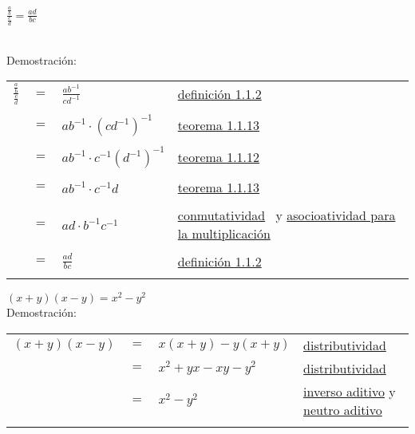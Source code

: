 \begin{teo}
$\displaystyle\frac{\displaystyle\frac{a}{b}}{\displaystyle\frac{c}{d}}=\displaystyle\frac{ad}{bc}$\\\\ \label{teo 1.1.18}

Demostración:
\begin{center}
\begin{tabular}{r c l l}
$\displaystyle\frac{\displaystyle\frac{a}{b}}{\displaystyle\frac{c}{d}}$&$=$&$\displaystyle\frac{ab^{-1}}{cd^{-1}}$&\hyperref[def 1.1.2]{definición 1.1.2}\\\\
&$=$&$ab^{-1}\cdot (cd^{-1})^{-1}$&\hyperref[teo 1.1.13]{teorema 1.1.13}\\\\
&$=$&$ab^{-1}\cdot c^{-1}(d^{-1})^{-1}$&\hyperref[teo 1.1.12]{teorema 1.1.12}\\\\
&$=$&$ab^{-1}\cdot c^{-1}d$&\hyperref[teo 1.1.13]{teorema 1.1.13}\\\\
&$=$&$ad\cdot b^{-1}c^{-1}$&\hyperref[M2]{conmutatividad} \
y \hyperref[M3]{asocioatividad para la multiplicación}\\\\
&$=$&$\displaystyle \frac{ad}{bc}$&\hyperref[def 1.1.2]{definición 1.1.2}\\\\
\end{tabular}
\end{center}
\end{teo}


\begin{teo}
$(x+y)(x-y)=x^2 - y^2$\\ \label{teo 1.1.19}
Demostración:
\begin{center}
\begin{tabular}{r c l l}
$(x+y)(x-y)$&$=$&$x(x+y)-y(x+y)$&\hyperref[D]{distributividad}\\
&$=$&$x^{2}+yx-xy - y^2$&\hyperref[D]{distributividad}\\
&$=$&$x^2-y^2$&\hyperref[A5]{inverso aditivo} y \hyperref[A4]{neutro aditivo}\\\\
\end{tabular}
\end{center}
\end{teo}



